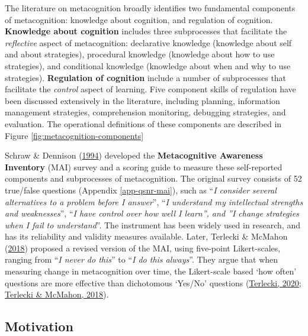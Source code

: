 \documentclass[letterpaper, nobind]{templates/ociamthesis}
\begin{document}
The literature on metacognition broadly identifies two fundamental
components of metacognition: knowledge about cognition, and regulation
of cognition. \textbf{Knowledge about cognition} includes three subprocesses
that facilitate the \emph{reflective} aspect of metacognition: declarative
knowledge (knowledge about self and about strategies), procedural
knowledge (knowledge about how to use strategies), and conditional
knowledge (knowledge about when and why to use strategies). \textbf{Regulation
of cognition} include a number of subprocesses that facilitate the
\emph{control} aspect of learning. Five component skills of regulation have
been discussed extensively in the literature, including planning,
information management strategies, comprehension monitoring, debugging
strategies, and evaluation. The operational definitions of these
components are described in Figure \ref{fig:metacognition-components}

Schraw \& Dennison (\protect\hyperlink{ref-schraw1994assessing}{1994}) developed the \textbf{Metacognitive Awareness Inventory} (MAI) survey and a
scoring guide to measure these self-reported components and subprocesses
of metacognition. The original survey consists of 52 true/false
questions (Appendix \ref{app-qsnr-mai}), such as ``\emph{I consider several alternatives to a problem before I answer}'', ``\emph{I understand my intellectual strengths and weaknesses}'', ``\emph{I have control over how well I learn'', and ''I change strategies when I fail to understand}''.
The instrument has been widely used in research, and has its reliability and validity measures available. Later, Terlecki \& McMahon (\protect\hyperlink{ref-terlecki2018call}{2018}) proposed a revised version of the MAI, using five-point Likert-scales, ranging from ``\emph{I never do this}'' to ``\emph{I do this always}''.
They argue that when measuring change in metacognition over time, the Likert-scale based `how often' questions are more effective than dichotomous `Yes/No' questions (\protect\hyperlink{ref-terlecki2020revising}{Terlecki, 2020}; \protect\hyperlink{ref-terlecki2018call}{Terlecki \& McMahon, 2018}).

\hypertarget{motivation}{%
\subsection{Motivation}\label{motivation}}
\end{document}
